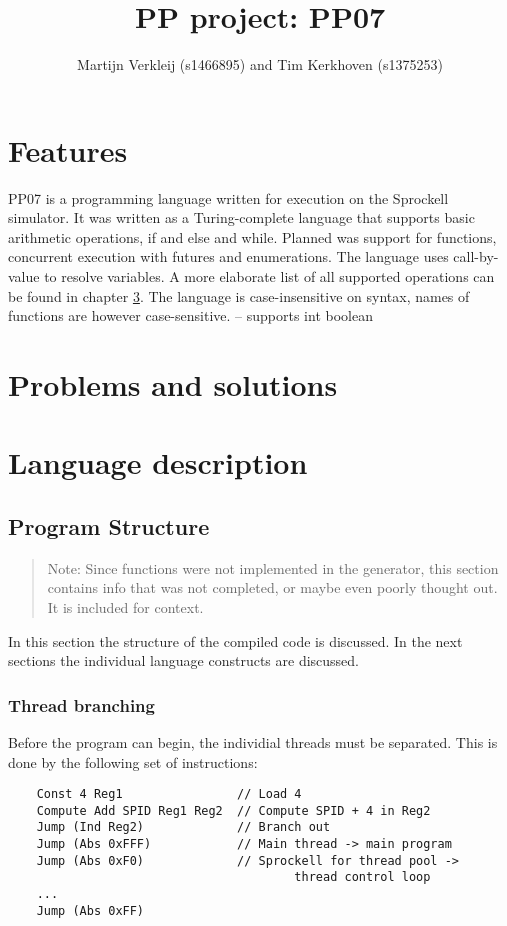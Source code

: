 \documentclass[10pt,a4paper]{report}
\author{Martijn Verkleij (s1466895) and Tim Kerkhoven (s1375253)}
\title{PP project: PP07}
\begin{document}
\maketitle
\tableofcontents


\chapter{Features}
PP07 is a programming language written for execution on the Sprockell simulator. It was written as a Turing-complete language that supports basic arithmetic operations, if and else and while. Planned was support for functions, concurrent execution with futures and enumerations. The language uses call-by-value to resolve variables. A more elaborate list of all supported operations can be found in chapter \ref{chp:langdesc}. The language is case-insensitive on syntax, names of functions are however case-sensitive. -- supports int boolean 

\chapter{Problems and solutions}



\chapter{Language description} \label{chp:langdesc}

\section{Program Structure} \label{sec:structure}

\begin{quote}
	Note: Since functions were not implemented in the generator, this section contains info that was not completed, or maybe even poorly thought out. It is included for context.
\end{quote}

In this section the structure of the compiled code is discussed. In the next sections the individual language constructs are discussed. 
\subsection{Thread branching}
Before the program can begin, the individial threads must be separated. This is done by the following set of instructions:
\begin{lstlisting}
	Const 4 Reg1				// Load 4
	Compute Add SPID Reg1 Reg2	// Compute SPID + 4 in Reg2
	Jump (Ind Reg2)				// Branch out
	Jump (Abs 0xFFF)			// Main thread -> main program
	Jump (Abs 0xF0)				// Sprockell for thread pool -> 
										thread control loop
	...
	Jump (Abs 0xFF)
\end{lstlisting}
\end{document}
